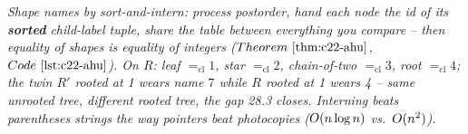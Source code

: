 \begin{recallbox}
\emph{Shape names by sort-and-intern: process postorder, hand each node the id of
its \textbf{sorted} child-label tuple, share the table between everything you
compare -- then equality of shapes is equality of integers
(\(\thmref{c22-ahu}\), \(\coderef{c22-ahu}\)).  On \(R\): leaf \(=_{\mathrm{cl}}1\),
star \(=_{\mathrm{cl}}2\), chain-of-two \(=_{\mathrm{cl}}3\), root \(=_{\mathrm{cl}}4\);
the twin \(R'\) rooted at 1 wears name \(7\) while \(R\) rooted at 1 wears 4 --
same unrooted tree, different rooted tree, the gap 28.3 closes.  Interning beats parentheses strings the way
pointers beat photocopies (\(O(n\log n)\) vs.\ \(O(n^2)\)).}
\end{recallbox}
